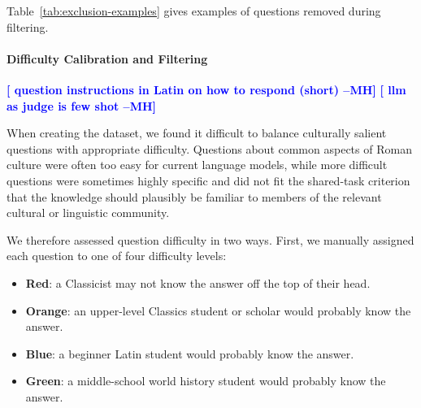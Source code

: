 \documentclass[11pt]{article}
\newcommand{\mhcomment}[1]{\textcolor{blue}{\bf \small [ #1 --MH]}}
\begin{document}

Table~\ref{tab:exclusion-examples} gives examples of questions removed during filtering.


\paragraph{Difficulty Calibration and Filtering} \label{sec:difficulty_filtering}

\mhcomment{question instructions in Latin on how to respond (short)}
\mhcomment{llm as judge is few shot}

When creating the dataset, we found it difficult to balance culturally salient questions with appropriate difficulty. Questions about common aspects of Roman culture were often too easy for current language models, while more difficult questions were sometimes highly specific and did not fit the shared-task criterion that the knowledge should plausibly be familiar to members of the relevant cultural or linguistic community.

We therefore assessed question difficulty in two ways. First, we manually assigned each question to one of four difficulty levels:

\begin{itemize}
    \vspace{-2mm}
    \item \textcolor{red!85!black}{\textbf{Red}}: a Classicist may not know the answer off the top of their head.
    \vspace{-3mm}
    \item \textcolor{orange!90!black}{\textbf{Orange}}: an upper-level Classics student or scholar would probably know the answer.
    \vspace{-3mm}
    \item \textcolor{blue!80!black}{\textbf{Blue}}: a beginner Latin student would probably know the answer.
    \vspace{-3mm}
    \item \textcolor{green!60!black}{\textbf{Green}}: a middle-school world history student would probably know the answer.
\end{itemize}
\end{document}
